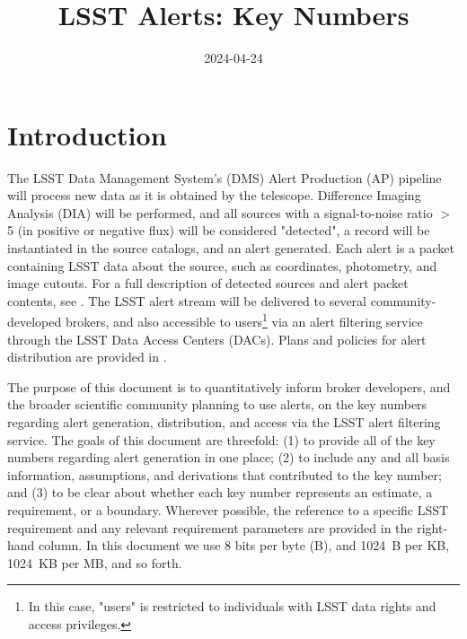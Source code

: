 \documentclass[DM,authoryear,toc]{lsstdoc}
\title[Alerts Key Numbers]{LSST Alerts: Key Numbers}
\date{2024-04-24}
\begin{document}
\maketitle

\section{Introduction} \label{sec:intro}

The \gls{LSST} \gls{Data Management System}'s (\gls{DMS}) \gls{Alert Production} (\gls{AP}) \gls{pipeline} will process new data as it is obtained by the telescope.
Difference Imaging Analysis (\gls{DIA}) will be performed, and all sources with a signal-to-noise ratio $>$5 (in positive or negative \gls{flux}) will be considered "detected", a record will be instantiated in the source catalogs, and an alert generated.
Each alert is a packet containing \gls{LSST} data about the source, such as coordinates, photometry, and image cutouts.
For a full description of detected sources and alert packet contents, see .
The \gls{LSST} alert stream will be delivered to several community-developed brokers, and also accessible to users\footnote{In this case, "users" is restricted to individuals with \gls{LSST} data rights and access privileges.} via an alert filtering service through the \gls{LSST} Data Access Centers (DACs).
Plans and policies for alert distribution are provided in .

The purpose of this document is to quantitatively inform broker developers, and the broader scientific community planning to use alerts, on the key numbers regarding alert generation, distribution, and access via the \gls{LSST} alert filtering service.
The goals of this document are threefold: (1) to provide all of the key numbers regarding alert generation in one place; (2) to include any and all basis information, assumptions, and derivations that contributed to the key number; and (3) to be clear about whether each key number represents an estimate, a requirement, or a boundary.
Wherever possible, the reference to a specific \gls{LSST} requirement and any relevant requirement parameters are provided in the right-hand column.
In this document we use 8 bits per byte (\gls{B}), and 1024~B per \gls{KB}, 1024~KB per \gls{MB}, and so forth.
\end{document}
